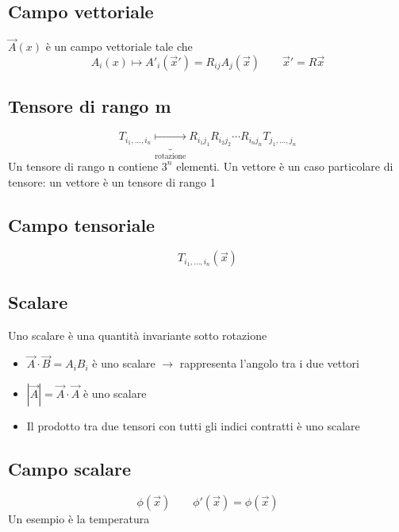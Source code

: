 \subsection*{Campo vettoriale}
$\vec{A}(x)$ è un campo vettoriale tale che 
\begin{equation*}
    A_i(x) \mapsto A'_i (\vec{x}') = R_{ij} A_j(\vec{x}) \qquad \vec{x}' = R \vec{x}
\end{equation*}

\subsection*{Tensore di rango m}

\begin{equation*}
    T_{i_1,\dots, i_n} \underbrace{\mapsto}_{\text{rotazione}} R_{i_1j_1}R_{i_2j_2}\cdots R_{i_nj_n}T_{j_1,\dots,j_n}
\end{equation*}
Un tensore di rango n contiene $3^n$ elementi. Un vettore è un caso particolare di tensore: un vettore è un tensore di rango 1

\subsection*{Campo tensoriale}
\begin{equation*}
    T_{i_1,\dots, i_n}(\vec{x})
\end{equation*}

\subsection*{Scalare}

Uno scalare è una quantità invariante sotto rotazione
\begin{itemize}
    \item $\vec{A} \cdot \vec{B} = A_iB_i$ è uno scalare $\rightarrow$ rappresenta l'angolo tra i due vettori
    \item $|\vec{A}| = \vec{A} \cdot \vec{A}$ è uno scalare
    \item Il prodotto tra due tensori con tutti gli indici contratti è uno scalare
\end{itemize}

\subsection*{Campo scalare}
\begin{equation*}
    \phi(\vec{x}) \qquad \phi'(\vec{x}) = \phi(\vec{x})
\end{equation*}
Un esempio è la temperatura

